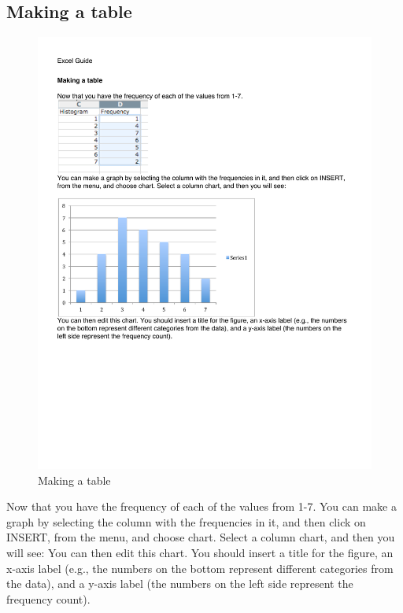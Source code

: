 \subsection{Making a table}

\begin{figure}
      \includegraphics[width=.7\linewidth]{LabmanualFigures/Excel14.pdf}
      \caption{Making a table}
      \label{fig:excel14}
\end{figure}
 
Now that you have the frequency of each of the values from 1-7.
You can make a graph by selecting the column with the frequencies in it, and then click on INSERT, from the menu, and choose chart. Select a column chart, and then you will see:
You can then edit this chart. You should insert a title for the figure, an x-axis label (e.g., the numbers on the bottom represent different categories from the data), and a y-axis label (the numbers on the left side represent the frequency count).
 

